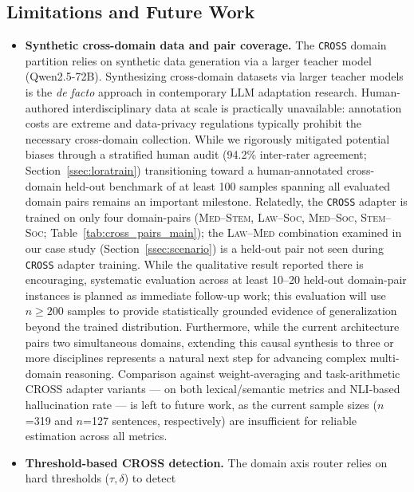 \documentclass[a4paper,fleql]{cas-sc}
\begin{document}
\subsection{Limitations and Future Work}
\label{sec:limitations}
\begin{itemize}
\item \textbf{Synthetic cross-domain data and pair coverage.}
The \texttt{CROSS} domain partition relies on synthetic data generation via a
larger teacher model (Qwen2.5-72B). Synthesizing cross-domain datasets via larger teacher models is the
\emph{de facto} approach in contemporary LLM adaptation research.
Human-authored interdisciplinary data at scale is practically unavailable:
annotation costs are extreme and data-privacy regulations typically prohibit
the necessary cross-domain collection. While we rigorously mitigated potential biases through
a stratified human audit (94.2\% inter-rater agreement;
Section~\ref{ssec:loratrain}) transitioning toward a human-annotated cross-domain held-out benchmark
of at least 100 samples spanning all evaluated domain pairs remains an
important milestone. Relatedly, the \texttt{CROSS} adapter is trained on only four
domain-pairs (\textsc{Med}--\textsc{Stem}, \textsc{Law}--\textsc{Soc},
\textsc{Med}--\textsc{Soc}, \textsc{Stem}--\textsc{Soc};
Table~\ref{tab:cross_pairs_main}); the \textsc{Law}--\textsc{Med} combination
examined in our case study (Section~\ref{ssec:scenario}) is a held-out pair
not seen during \texttt{CROSS} adapter training. While the qualitative result reported there is encouraging, systematic
evaluation across at least 10--20 held-out domain-pair instances is planned
as immediate follow-up work; this evaluation will use $n{\geq}200$ samples to provide statistically grounded
evidence of generalization beyond the trained distribution. Furthermore, while the current architecture pairs
two simultaneous domains, extending this causal synthesis to three or more
disciplines represents a natural next step for advancing complex
multi-domain reasoning.
Comparison against weight-averaging and task-arithmetic CROSS adapter variants --- on both lexical/semantic metrics and NLI-based hallucination rate --- is left to future work, as the current sample sizes ($n$=319 and $n$=127 sentences, respectively) are insufficient for reliable estimation across all metrics.
\item \textbf{Threshold-based CROSS detection.} The domain axis router relies on hard thresholds ($\tau, \delta$) to detect

\end{itemize}
\end{document}
